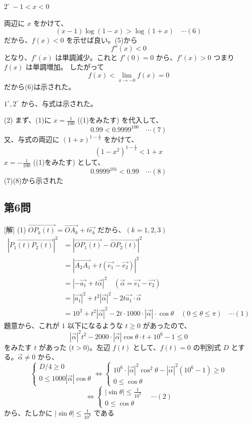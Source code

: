 \documentclass[../main.tex]{subfiles}
\begin{document}
$2^\circ \ -1 < x < 0$

両辺に $x$ をかけて、
\[
(x-1) \log(1-x) > \log(1+x) \quad \cdots (6)
\]
だから、$f(x) < 0$ を示せば良い。(5)から
\[
f''(x) < 0
\]
となり、$f'(x)$ は単調減少。これと $f'(0) = 0$ から、$f'(x) > 0$ つまり $f(x)$ は単調増加。
したがって
\[
f(x) < \lim_{x \to -0} f(x) = 0
\]
だから(6)は示された。

$1^\circ, 2^\circ$ から、与式は示された。

(2) まず、(1)に $x = \frac{1}{100}$ ((1)をみたす) を代入して、
\[
0.99 < 0.9999^{100} \quad \cdots (7)
\]
又、与式の両辺に $(1+x)^{1-\frac{1}{x}}$ をかけて、
\[
(1-x^2)^{1-\frac{1}{x}} < 1+x
\]
$x = -\frac{1}{100}$ ((1)をみたす) として、
\[
0.9999^{101} < 0.99 \quad \cdots (8)
\]
(7)(8)から示された 

\subsection*{第6問}
[解]
(1) $\overrightarrow{OP_k(t)} = \overrightarrow{OA_k} + t \overrightarrow{e_k}$ だから、$(k=1,2,3)$
\begin{align*}
|\overrightarrow{P_1(t) P_2(t)}|^2 &= |\overrightarrow{OP_1(t)} - \overrightarrow{OP_2(t)}|^2 \\
&= \left| \overrightarrow{A_2 A_1} + t (\overrightarrow{e_1} - \overrightarrow{e_2}) \right|^2 \\
&= |-\overrightarrow{a_1} + t \overrightarrow{\alpha}|^2 \quad (\overrightarrow{\alpha} = \overrightarrow{e_1} - \overrightarrow{e_2}) \\
&= |\overrightarrow{a_1}|^2 + t^2 |\overrightarrow{\alpha}|^2 - 2t \overrightarrow{a_1} \cdot \overrightarrow{\alpha} \\
&= 10^2 + t^2 |\overrightarrow{\alpha}|^2 - 2t \cdot 1000 \cdot |\overrightarrow{\alpha}| \cdot \cos \theta \quad (0 \le \theta \le \pi) \quad \cdots (1)
\end{align*}
題意から、これが $1$ 以下になるような $t \ge 0$ があったので、
\[
|\overrightarrow{\alpha}|^2 t^2 - 2000 \cdot |\overrightarrow{\alpha}| \cos \theta \cdot t + 10^6 - 1 \le 0
\]
をみたす $t$ があった ($t>0$)。左辺 $f(t)$ として、$f(t)=0$ の判別式 $D$ とする。$\overrightarrow{\alpha} \ne 0$ から、
\[
\begin{cases}
  D/4 \ge 0 \\
  0 \le 1000 |\overrightarrow{\alpha}| \cos \theta
\end{cases} \iff
\begin{cases}
  10^6 \cdot |\overrightarrow{\alpha}|^2 \cos^2 \theta - |\overrightarrow{\alpha}|^2 (10^6-1) \ge 0 \\
  0 \le \cos \theta
\end{cases}
\]
\[
\iff
\begin{cases}
  |\sin \theta| \le \frac{1}{10^3} \\
  0 \le \cos \theta
\end{cases} \quad \cdots (2)
\]
から、たしかに $|\sin \theta| \le \frac{1}{10^3}$ である 
\end{document}
